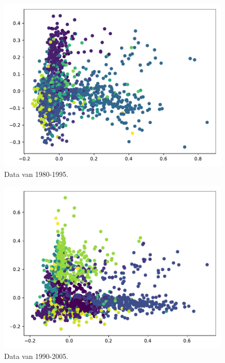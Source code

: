 \documentclass[a4paper,fontsize=11pt]{article}
\begin{document}
\begin{figure}[H]
  \centering
  \includegraphics[width=\textwidth]{pca_1980-1995.pdf}
  \caption{Data van 1980-1995.}
  \label{fig:1980}
\end{figure}

\begin{figure}[H]
  \centering
  \includegraphics[width=\textwidth]{pca_1990-2005.pdf}
  \caption{Data van 1990-2005.}
  \label{fig:1990}
\end{figure}
\end{document}
